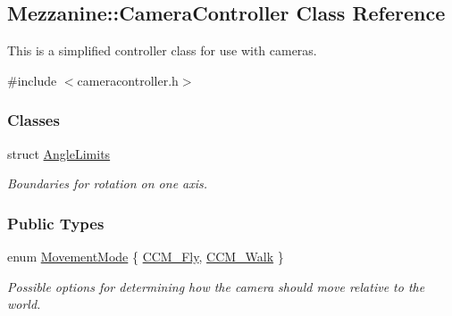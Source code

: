\hypertarget{classMezzanine_1_1CameraController}{
\subsection{Mezzanine::CameraController Class Reference}
\label{classMezzanine_1_1CameraController}
}


This is a simplified controller class for use with cameras.  




{\ttfamily \#include $<$cameracontroller.h$>$}

\subsubsection*{Classes}
\begin{DoxyCompactItemize}
\item 
struct \hyperlink{structMezzanine_1_1CameraController_1_1AngleLimits}{AngleLimits}
\begin{DoxyCompactList}\small\item\em Boundaries for rotation on one axis. \item\end{DoxyCompactList}\end{DoxyCompactItemize}
\subsubsection*{Public Types}
\begin{DoxyCompactItemize}
\item 
enum \hyperlink{classMezzanine_1_1CameraController_a2e4a40630fb6c845b8073151dc36c286}{MovementMode} \{ \hyperlink{classMezzanine_1_1CameraController_a2e4a40630fb6c845b8073151dc36c286a0278660084281f11192f9350b17a0621}{CCM\_\-Fly}, 
\hyperlink{classMezzanine_1_1CameraController_a2e4a40630fb6c845b8073151dc36c286a3e59766116db3f0d979787d66405d2fb}{CCM\_\-Walk}
 \}
\begin{DoxyCompactList}\small\item\em Possible options for determining how the camera should move relative to the world. \item\end{DoxyCompactList}\end{DoxyCompactItemize}

